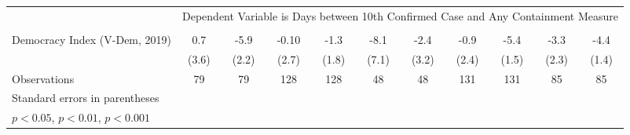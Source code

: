 {\begin{tabular}{l*{10}{c}}
& \multicolumn{10}{c}{Dependent Variable is Days between 10th Confirmed Case and Any Containment Measure} \\\cline{2-11}\\[-1.8ex]
Democracy Index (V-Dem, 2019)&         0.7         &        -5.9\sym{**} &       -0.10         &        -1.3         &        -8.1         &        -2.4         &        -0.9         &        -5.4\sym{***}&        -3.3         &        -4.4\sym{**} \\
&       (3.6)         &       (2.2)         &       (2.7)         &       (1.8)         &       (7.1)         &       (3.2)         &       (2.4)         &       (1.5)         &       (2.3)         &       (1.4)         \\
\hline
Observations        &          79         &          79         &         128         &         128         &          48         &          48         &         131         &         131         &          85         &          85         \\
\hline\hline
\multicolumn{11}{l}{\footnotesize Standard errors in parentheses}\\
\multicolumn{11}{l}{\footnotesize \sym{*} \(p<0.05\), \sym{**} \(p<0.01\), \sym{***} \(p<0.001\)}\\
\end{tabular}
}
